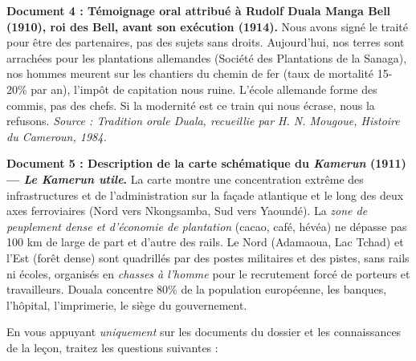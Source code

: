 \documentclass[11pt]{article}
\newcounter{popsec}
\newcounter{popsub}
\newcommand{\courssub}[1]{%
  \stepcounter{popsub}%
  \par\vspace{9pt}\noindent{\popxbold\fontsize{11.5}{13}\selectfont\color{popink}{\color{poporange}\thepopsec.\thepopsub}\hspace{6pt}#1}\par\nopagebreak\vspace{4pt}
}
\begin{document}
\medskip
\textbf{Document 4 : Témoignage oral attribué à Rudolf Duala Manga Bell (1910), roi des Bell, avant son exécution (1914).}
\og Nous avons signé le traité pour être des partenaires, pas des sujets sans droits. Aujourd'hui, nos terres sont arrachées pour les plantations allemandes (Société des Plantations de la Sanaga), nos hommes meurent sur les chantiers du chemin de fer (taux de mortalité 15-20\% par an), l'impôt de capitation nous ruine. L'école allemande forme des commis, pas des chefs. Si la modernité est ce train qui nous écrase, nous la refusons. \fg
\emph{Source : Tradition orale Duala, recueillie par H. N. Mougoue, \emph{Histoire du Cameroun}, 1984.}

\medskip
\textbf{Document 5 : Description de la carte schématique du \emph{Kamerun} (1911) — \emph{Le Kamerun utile}.}
La carte montre une concentration extrême des infrastructures et de l'administration sur la façade atlantique et le long des deux axes ferroviaires (Nord vers Nkongsamba, Sud vers Yaoundé). La \emph{zone de peuplement dense et d'économie de plantation} (cacao, café, hévéa) ne dépasse pas 100 km de large de part et d'autre des rails. Le Nord (Adamaoua, Lac Tchad) et l'Est (forêt dense) sont quadrillés par des postes militaires et des pistes, sans rails ni écoles, organisés en \emph{chasses à l'homme} pour le recrutement forcé de porteurs et travailleurs. Douala concentre 80\% de la population européenne, les banques, l'hôpital, l'imprimerie, le siège du gouvernement.

\courssub{Consignes}
En vous appuyant \emph{uniquement} sur les documents du dossier et les connaissances de la leçon, traitez les questions suivantes :
\end{document}
